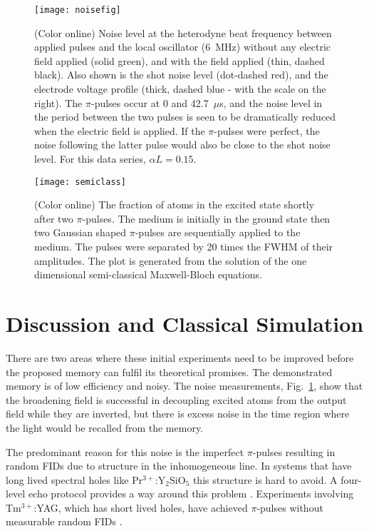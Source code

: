                                                                                                                                                                                                                                                                                                                                                                                                                                                                                                                                                                                                                                                                                                                                                                                                                                                                                                                                                                                                                                                                                                                                                                                                                                                                                                                                                                                                                                                                                                                                                                                                                                                                                                                                                                                                                                                                                                                                                                                                                                                                                                                                                                                                                                                                                                                                                                                                                                                                                                                                                                                                                                                                                                                                                                                                                                                                                                                                                                                                                                                                                                                                                                                                                                                                                                                                                                                                                                                                                                                                                                                                                                                                                                                                                                                                                                                                                                                                                                                                                                                                                                                                                                                                                                                                                                                                                                                                                                                                                                                                                                                                                                                                                                                                                                                                                                                                                                                                                                                                                                                                                                                                                                                                                                                                                                                                                                                                                                                                                                                                                                                                                                                                                                                                                                                                                                                                                                                                                                                                                                                                                                                                                                                                                                                                                                                                                                                                                                                                                                                                                                                                                                                                                                                                                                                                                                                                                                                                                                                                                                                                                                                                                                                                                                                                                                                                                                                                                                                                                                                                                                                                                                                                                                                                                                                                                                                                                                                                                                                                                                                                                                                                                                                                                                                                                                                                                                                                                                                                                                                                                                                                                                                                                                                                                                                                                                                                                                                                                                                                                                                                                                                                                                                                                                                                                                                                                                                                                                                                                                                                                                                                                                                                                                                                                                                                                                                                                                                                                                                                                                                                                                                                                                                                                                                                                                                                                                                                                                                                                                                                                                                                                                                                                                                                                                                                                                                                                                                                                                                                                                                                                                                                                                                                                                                                                                                                                                                                                                                                                                                                                                                                                                                                                                                                                                                                                                                                                                                                                                                                                                                                                                                                                                                                                                                                                                                                                                                                                                                                                                                                                                                                                                                                                                                                                                                                                                                                                                                                                                                                                                                                                                                                                                                                                                                                                                                                                                                                                                                                                                                                                                                                                                                                                                                                                                                                                                                                                                                                                                                                                                                                                                                                                                                                                                                                                                                                                                                                                                                                                                                                                                                                                                                                                                                                                                                                                                                                                                                                                                                                                                                                                                                                                                                                                                                                                                                                                                                                                                                                                                                                                                                                                                                                                                                                                                                                                                                                                                                                                                                                                                                                                                                                                                                                                                                                                                                                                                                                                                                                                                                                                                                                                                                                                                                                                                                                                                                                                                                                                                                                                                                                                                                                                                                                                                                                                                                                                                                                                                                                                                                                                                                                                                                                                                                                                                                                                                                                                                                                                                                                                                                                                                                                                                                                                                                                                                                                                                                                                                                                                                                                                                                                                                                                                                                                                                                                                                                                                                                                                                                                                                                                                                                                                                                                                                                                                                                                                                                                                                                                                                                                                                                                                                                                                                                                                                                                                                                                                                                                                                                                                                                                                                                                                                                                                                                                                                                                                                                                                                                                                                                                                                                                                                                                                                                                                                                                                                                                                                                                                                                                                                                                                                                                                                                                                                                                                                                                                                                                                                                                                                                                                                                                                                                                                                                                                                                                                                                                                                                                                                                                                                                                                                                                                                                                                                                                                                                                                                                                                                                                                                                                                                                                                                                                                                                                                                                                                                                                                                                                                                                                                                                                                                                                                                                                                                                                                                                                                                                                                                                                                                                                                                                                                                                                                                                                                                                                                                                                                                                                                                                                                                                                                                                                                                                                                                                                                                                                                                                                                                                                                                                                                                                                                                                                                                                                                                                                                                                                                                                                                                                                                                                                                                                                                                                                                                                                                                                                                                                                                                                                                                                                                                                                                                                                                                                                                                                                                                                                                                                                                                                                                                                                                                                                                                                                                                                                                                                                                                                                                                                                                                                                                                                                                                                                                                                                                                                                                                                                                                                                                                                                                                                                                                                                                                                                                                                                                                                                                                                                                                                                                                                                                                                                                                                                                                                                                                                                                                                                                                                                                                                                                                                                                                                                                                                                                                                                                                                                                                                                                                                                                                                                                                                                                                                                                                                                                                                                                                                                                                                                                                                                                                                                                                                                                                                                                                                                                                                                                                                                                                                                                                                                                                                                                                                                                                                                                                                                                                                                                                                                                                                                                                                                                                                                                                                                                                                                                                                                                                                                                                                                                                                                                                                                                                                                                                                                                                                                                                                                                                                                                                                                                                                                                                                                                                                                                                                                                                                                                                                                                                                                                                                                                                                                                                                                                                                                                                                                                                                                                                                                                                                                                                                                                                                                                                                                                                                                                                                                                                                                                                                                                                                                                                                                                                                                                                                                                                                                                                                                                                                                                                                                                                                                                                                                                                                                                                                                                                                                                                                                                                                                                                                                                                                                                                                                                                                                                                                                                                                                                                                                                                                                                                                                                                                                                                                                                                                                                                                                                                                                                                                                                                                                                                                                                                                                                                                                                                                                                                                                                                                                                                                                                                                                                                                                                                                                                                                                                                                                                                                                                                                                                                                                                                                                                                                                                                                                                                                                                                                                                                                                                                                                                                                                                                                                                                                                                                                                                                                                                                                                                                                                                                                                                                                                                                                                                                                                                                                                                                                                                                                                                                                                                                                                                                                                                                                                                                                                                                                                                                                                                                                                                                                                                                                                                                                                                                                                                                                                                                                                                                                                                                                                                                                                                                                                                                                                                                                                                                                                                                                                                                                                                                                                                                                                                                                                                                                                                                                                                                                                                                                                                                                                                                                                                                                                                                                                                                                                                                                                                                                                                                                                                                                                                                                                                                                                                                                                                                                                                                                                                                                                                                                                                                                                                                                                                                                                                                                                                                                                                                                                                                                                                                                                                                                                                                                                                                                                                                                                                                                                                                                                                                                                                                                                                                                                                                                                                                                                                                                                                                                                                                                                                                                                                                                                                                                                                                                                                                                                                                                                                                                                                                                                                                                                                                                                                                                                                                                                                                                                                                                                                                                                                                                                                                                                                                                                                                                                                                                                                                                                                                                                                                                                                                                                                                                                                                                                                                                                                                                                                                                                                                                                                                                                                                                                                                                                                                                                                                                                                                                                                                                                                                                                                                                                                                                                                                                                                                                                                                                                                                                                                                                                                                                                                                                                                                                                                                                                                                                                                                                                                                                                                                                                                                                                                                                                                                                                                                                                                                                                                                                                                                                                                                                                                                                                                                                                                                                                                                                                                                                                                                                                                                                                                                                                                                                                                                                                                                                                                                                                                                                                                                                                                                                                                                                                                                                                                                                                                                                                                                                                                                                                                                                                                                                                                                                                                                                                                                                                                                                                                                                                                                                                                                                                                                                                                                                                                                                                                                                                                                                                                                                                                                                                                                                                                                                                                                                                                                                                                                                                                                                                                                                                                                                                                                                                                                                                                                                                                                                                                                                                                                                                                                                                                                                                                                                                                                                                                                                                                                                                                                                                                                                                                                                                                                                                                                                                                                                                                                                                                                                                                                                                                                                                                                                                                                                                                                                                                                                                                                                                                                                                                                                                                                                                                                                                                                                                                                                                                                                                                                                                                                                                                                                                                                                                                                                                                                                                                                                                                                                                                                                                                                                                                                                                                                                                                                                                                                                                                                                                                                                                                                                                                                                    \documentclass[superscriptaddress,pra,twocolumn,showpacs,amsmath,amssymb,aps,a4paper]{revtex4}
\newcommand{\PRYSO}{Pr$^{3+}$:Y$_2$SiO$_5$ }
\begin{document}
\begin{figure}[h]
	\centering
	\texttt{[image: noisefig]}
        \caption{(Color online) Noise level at the heterodyne beat
          frequency between applied pulses and the local oscillator
          (6~MHz) without any electric field applied (solid green), and with
          the field applied (thin, dashed black).  Also shown is the shot noise
          level (dot-dashed red), and the electrode voltage profile (thick, dashed blue - with
          the scale on the right).  The $\pi$-pulses occur at 0 and
          42.7~$\mu$s, and the noise level in the period between the
          two pulses is seen to be dramatically reduced when the
          electric field is applied.  If the $\pi$-pulses were
          perfect, the noise following the latter pulse would also be
          close to the shot noise level.  For this data series,
          ${\alpha}L=0.15$.  }
\label{fig:NoiseFig}
\end{figure}




\begin{figure}
  \centering
  \texttt{[image: semiclass]}
  \caption{\label{fig:semiclass}(Color online) The fraction of  atoms
    in the excited state shortly after two $\pi$-pulses. The medium is
    initially in the ground state then two Gaussian shaped
    $\pi$-pulses are sequentially applied to the medium. The pulses
    were separated by 20 times the FWHM of their amplitudes. The plot
    is generated from the solution of the one dimensional semi-classical Maxwell-Bloch equations.}
\end{figure}


\section{Discussion and Classical Simulation}

There are two areas where these initial experiments need to be
improved before the proposed memory can fulfil its theoretical
promises. The demonstrated memory is of low efficiency and noisy. The
noise measurements, Fig.~\ref{fig:NoiseFig}, show that the broadening field is
successful in decoupling excited atoms from the output field while they
are inverted, but there is excess noise in the time region where the light would be
recalled from the memory. 

The predominant reason for this noise is the imperfect $\pi$-pulses
resulting in random FIDs due to structure in the
inhomogeneous line. In systems that have long lived spectral holes
like \PRYSO this structure is hard to avoid. A four-level echo
protocol provides a way around this problem \cite{beav11}. Experiments
involving Tm$^{3+}$:YAG, which has short lived holes, have achieved $\pi$-pulses 
without measurable random FIDs
\cite{ledingham_in_prep}.
\end{document}
